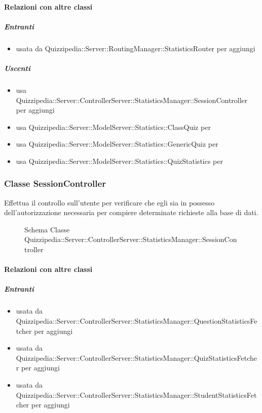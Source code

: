 \paragraph{Relazioni con altre classi}
\subparagraph{Entranti}
\begin{itemize}
\item usata da Quizzipedia::Server::RoutingManager::StatisticsRouter per aggiungi
\end{itemize}
\subparagraph{Uscenti}
\begin{itemize}
\item usa Quizzipedia::Server::ControllerServer::StatisticsManager::SessionController per aggiungi
\item usa Quizzipedia::Server::ModelServer::Statistics::ClassQuiz per 
\item usa Quizzipedia::Server::ModelServer::Statistics::GenericQuiz per 
\item usa Quizzipedia::Server::ModelServer::Statistics::QuizStatistics per 
\end{itemize}
\subsubsection{Classe SessionController}
Effettua il controllo sull'utente per verificare che egli sia in possesso dell'autorizzazione necessaria per compiere determinate richieste alla base di dati.
\begin{figure}[H]
\centering
\noindent{}
\caption[Schema Classe SessionController]{Schema Classe Quizzipedia::Server::ControllerServer::StatisticsManager::SessionController}
\end{figure}
\paragraph{Relazioni con altre classi}
\subparagraph{Entranti}
\begin{itemize}
\item usata da Quizzipedia::Server::ControllerServer::StatisticsManager::QuestionStatisticsFetcher per aggiungi
\item usata da Quizzipedia::Server::ControllerServer::StatisticsManager::QuizStatisticsFetcher per aggiungi
\item usata da Quizzipedia::Server::ControllerServer::StatisticsManager::StudentStatisticsFetcher per aggiungi
\end{itemize}
